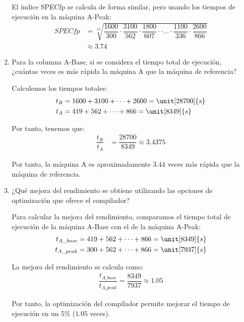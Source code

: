 \begin{ejercicio}
\begin{enumerate}
    El índice SPECfp se calcula de forma similar, pero usando los tiempos de ejecución en la máquina A-Peak:
    \begin{align*}
        SPECfp &= \sqrt[14]{\dfrac{1600}{300} \cdot \dfrac{3100}{562} \cdot \dfrac{1800}{607} \cdot \cdot \dots\cdot \dfrac{1100}{336} \cdot \dfrac{2600}{866}}\\
        &\approx 3.74
    \end{align*}
    \item Para la columna A-Base, si se considera el tiempo total de ejecución, ¿cuántas veces es más rápida la máquina A que la máquina de referencia?
    
    Calculemos los tiempos totales:
    \begin{align*}
        t_{R} &= 1600 + 3100 + \dots + 2600 = \unit[28700]{s}\\
        t_{A} &= 419 + 562 + \dots + 866 = \unit[8349]{s}
    \end{align*}

    Por tanto, tenemos que:
    \begin{align*}
        \dfrac{t_{R}}{t_{A}} &= \dfrac{28700}{8349} \approx 3.4375
    \end{align*}

    Por tanto, la máquina A es aproximadamente $3.44$ veces más rápida que la máquina de referencia.

    \item ¿Qué mejora del rendimiento se obtiene utilizando las opciones de optimización que ofrece el compilador?
    
    Para calcular la mejora del rendimiento, comparamos el tiempo total de ejecución de la máquina A-Base con el de la máquina A-Peak:
    \begin{align*}
        t_{A\_base} &= 419 + 562 + \dots + 866 = \unit[8349]{s}\\
        t_{A\_peak} &= 300 + 562 + \dots + 866 = \unit[7937]{s}
    \end{align*}

    La mejora del rendimiento se calcula como:
    \begin{align*}
        \dfrac{t_{A\_base}}{t_{A\_peak}} = \dfrac{8349}{7937} \approx 1.05
    \end{align*}

    Por tanto, la optimización del compilador permite mejorar el tiempo de ejecución en un $5\%$ ($1.05$ veces).
\end{enumerate}
\end{ejercicio}
\begin{comment}Sol:
1. SPECfp\_base = 3,48 y SPECfp = 3,74.
2. La máquina A es 3,44 veces más rápida que la de referencia.
3. La optimización del compilador permite mejorar 1,05 veces el tiempo de ejecución (un 5%
\end{comment}

